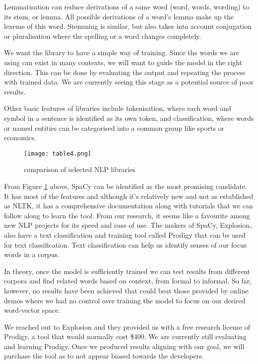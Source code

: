 \documentclass[12pt, usenames, dvipsnames]{report}
\begin{document}
\begin{flushleft}
Lemmatisation can reduce derivations of a same word (word, words, wording) to its stem, or lemma.
All possible derivations of a word’s lemma make up the lexeme of this word.
Stemming is similar, but also takes into account conjugation or pluralisation where the spelling or a word changes completely.

We want the library to have a simple way of training.
Since the words we are using can exist in many contexts, we will want to guide the model in the right direction.
This can be done by evaluating the output and repeating the process with trained data.
We are currently seeing this stage as a potential source of poor results.

Other basic features of libraries include tokenisation, where each word and symbol in a sentence is identified as its own token, and classification, where words or named entities can be categorised into a common group like sports or economics.

\vspace*{1.2em}
\begin{figure}[!htbp]
  \hspace*{-3.666em}
  \texttt{[image: table4.png]}
  \caption{comparison of selected NLP libraries}
  \label{fig:table4}
\end{figure}
\vspace*{1.2em}

From Figure \ref{fig:table4} above, SpaCy can be identified as the most promising candidate.
It has most of the features and although it’s relatively new and not as established as NLTK, it has a comprehensive documentation along with tutorials that we can follow along to learn the tool.
From our research, it seems like a favourite among new NLP projects for its speed and ease of use.
The makers of SpaCy, Explosion, also have a text classification and training tool called Prodigy that can be used for text classification.
Text classification can help us identify senses of our focus words in a corpus.

In theory, once the model is sufficiently trained we can test results from different corpora and find related words based on context, from formal to informal.
So far, however, no results have been achieved that could beat those provided by online demos where we had no control over training the model to focus on our desired word-vector space.

We reached out to Explosion and they provided us with a free research license of Prodigy, a tool that would normally cost \$400.
We are currently still evaluating and learning Prodigy.
Once we produced results aligning with our goal, we will purchase the tool as to not appear biased towards the developers.


\end{flushleft}
\end{document}

